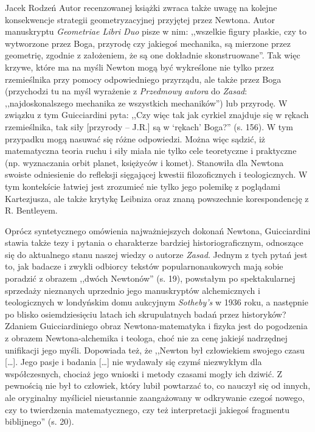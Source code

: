 \begin{recplenv}{Jacek Rodzeń}
Autor recenzowanej książki zwraca także uwagę na kolejne konsekwencje strategii geometryzacyjnej przyjętej przez
Newtona. Autor manuskryptu \textit{Geometriae Libri Duo} pisze w nim: ,,wszelkie figury płaskie, czy to wytworzone przez
Boga, przyrodę czy jakiegoś mechanika, są mierzone przez geometrię, zgodnie z założeniem, że są one dokładnie
skonstruowane''. Tak więc krzywe, które ma na myśli Newton mogą być wykreślone nie tylko przez rzemieślnika przy pomocy
odpowiedniego przyrządu, ale także przez Boga (przychodzi tu na myśl wyrażenie z \textit{Przedmowy autora} do
\textit{Zasad}: ,,najdoskonalszego mechanika ze wszystkich mechaników'') lub przyrodę. W związku z tym Guicciardini pyta:
,,Czy więc tak jak cyrkiel znajduje się w rękach rzemieślnika, tak siły [przyrody -- J.R.] są w ‘rękach’ Boga?'' (s. 156).
W tym przypadku mogą nasuwać się różne odpowiedzi. Można więc sądzić, iż matematyczna teoria ruchu i siły miała nie
tylko cele teoretyczne i praktyczne (np. wyznaczania orbit planet, księżyców i komet). Stanowiła dla Newtona swoiste
odniesienie do refleksji sięgającej kwestii filozoficznych i teologicznych. W tym kontekście łatwiej jest zrozumieć nie
tylko jego polemikę z poglądami Kartezjusza, ale także krytykę Leibniza oraz znaną powszechnie korespondencję z R.
Bentleyem. 

Oprócz syntetycznego omówienia najważniejszych dokonań Newtona, Guicciardini stawia także tezy i pytania o
charakterze bardziej historiograficznym, odnoszące się do aktualnego stanu naszej wiedzy o autorze \textit{Zasad}.
Jednym z tych pytań jest to, jak badacze i zwykli odbiorcy tekstów popularnonaukowych mają sobie poradzić z obrazem
,,dwóch Newtonów'' (s. 19), powstałym po spektakularnej sprzedaży nieznanych uprzednio jego manuskryptów alchemicznych i
teologicznych w londyńskim domu aukcyjnym \textit{Sotheby’s} w 1936 roku, a następnie po blisko osiemdziesięciu latach
ich skrupulatnych badań przez historyków? Zdaniem Guicciardiniego obraz Newtona-matematyka i fizyka jest do pogodzenia
z obrazem Newtona-alchemika i teologa, choć nie za cenę jakiejś nadrzędnej unifikacji jego myśli. Dopowiada też, że
,,Newton był człowiekiem swojego czasu […]. Jego pasje i badania […] nie wydawały się czymś niezwykłym dla
współczesnych, chociaż jego wnioski i metody czasami mogły ich dziwić. Z pewnością nie był to człowiek, który lubił
powtarzać to, co nauczył się od innych, ale oryginalny myśliciel nieustannie zaangażowany w odkrywanie czegoś nowego,
czy to twierdzenia matematycznego, czy też interpretacji jakiegoś fragmentu biblijnego'' (s. 20). 


\end{recplenv}
